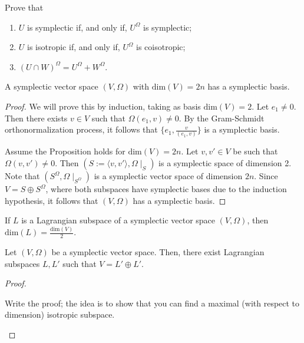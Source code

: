 \documentclass[12pt]{book}
\begin{document}
\begin{Exc}
    Prove that
    \begin{enumerate}[label=\ExcLbl]
    
        \item $U$ is symplectic if, and only if, $U^\Omega$ is symplectic;

        \item $U$ is isotropic if, and only if, $U^\Omega$ is coisotropic;

        \item $(U\cap W)^\Omega = U^\Omega + W^\Omega$.
    \end{enumerate}
\end{Exc}

\begin{Prp}[]\label{Prp: }
    A symplectic vector space $(V,\Omega)$ with $\text{dim}(V)=2n$ has a symplectic basis.

    \begin{proof}
    
        We will prove this by induction, taking as basis $\text{dim}(V)=2$. Let $e_1\neq 0$. Then there exists $v\in V$ such that $\Omega(e_1,v)\neq 0$. By the Gram-Schmidt orthonormalization process, it follows that $\{e_1, \frac{v}{(e_1,v)}\}$ is a symplectic basis.

        Assume the Proposition holds for $\text{dim}(V)=2n$. Let $v,v'\in V$ be such that $\Omega(v,v')\neq 0$. Then $(S := \langle v,v' \rangle, \Omega\mid_S)$ is a symplectic space of dimension 2. Note that $(S^\Omega, \Omega\mid_{S^\Omega})$ is a symplectic vector space of dimension $2n$. Since $V=S\oplus S^\Omega$, where both subspaces have symplectic bases due to the induction hypothesis, it follows that $(V,\Omega)$ has a symplectic basis.
    \end{proof}
\end{Prp}

\begin{Rmk}\label{Rmk: Dimension of Lagrangian subspaces}
    If $L$ is a Lagrangian subspace of a symplectic vector space $(V,\Omega)$, then $\text{dim}(L) = \frac{\text{dim}(V)}{2}$.
\end{Rmk}

\begin{Prp}\label{Prp: Lagrangian split}
    Let $(V,\Omega)$ be a symplectic vector space. Then, there exist Lagrangian subspaces $L,L'$ such that $V=L'\oplus L'$.

    \begin{proof}
    
        \begin{Exc}
        Write the proof; the idea is to show that you can find a maximal (with respect to dimension) isotropic subspace.
        \end{Exc}
        
    \end{proof}
\end{Prp}
\end{document}
